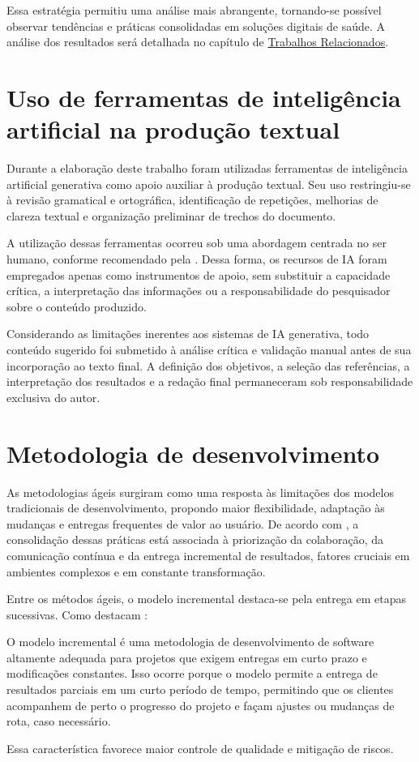 Essa estratégia permitiu uma análise mais abrangente, tornando-se possível observar tendências e práticas consolidadas em soluções digitais de saúde. A análise dos resultados será detalhada no capítulo de \hyperref[cap_trabalhos_relacionados]{Trabalhos Relacionados}.

\section{Uso de ferramentas de inteligência artificial na produção textual}

Durante a elaboração deste trabalho foram utilizadas ferramentas de inteligência artificial generativa como apoio auxiliar à produção textual. Seu uso restringiu-se à revisão gramatical e ortográfica, identificação de repetições, melhorias de clareza textual e organização preliminar de trechos do documento.

A utilização dessas ferramentas ocorreu sob uma abordagem centrada no ser humano, conforme recomendado pela . Dessa forma, os recursos de IA foram empregados apenas como instrumentos de apoio, sem substituir a capacidade crítica, a interpretação das informações ou a responsabilidade do pesquisador sobre o conteúdo produzido.

Considerando as limitações inerentes aos sistemas de IA generativa, todo conteúdo sugerido foi submetido à análise crítica e validação manual antes de sua incorporação ao texto final. A definição dos objetivos, a seleção das referências, a interpretação dos resultados e a redação final permaneceram sob responsabilidade exclusiva do autor.

\section{Metodologia de desenvolvimento}

As metodologias ágeis surgiram como uma resposta às limitações dos modelos tradicionais de desenvolvimento, propondo maior flexibilidade, adaptação às mudanças e entregas frequentes de valor ao usuário. De acordo com , a consolidação dessas práticas está associada à priorização da colaboração, da comunicação contínua e da entrega incremental de resultados, fatores cruciais em ambientes complexos e em constante transformação.

Entre os métodos ágeis, o modelo incremental destaca-se pela entrega em etapas sucessivas. Como destacam :
\begin{citacao}
O  modelo  incremental  é  uma  metodologia  de  desenvolvimento  de software altamente adequada para projetos que exigem entregas em curto prazo e modificações constantes. Isso ocorre porque o modelo permite  a  entrega  de  resultados  parciais  em  um  curto  período  de  tempo,  permitindo  que  os  clientes  acompanhem  de  perto  o progresso do projeto e façam ajustes ou mudanças de rota, caso necessário.
\end{citacao}
Essa característica favorece maior controle de qualidade e mitigação de riscos.

